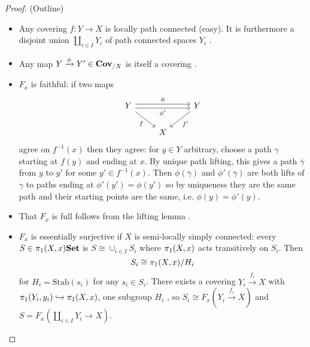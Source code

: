 \begin{proof}(Outline)
    \begin{itemize}
        \item Any covering $f: Y \to X$ is locally path connected (easy). It is furthermore a disjoint union $\coprod_{i \in I} Y_i$ of path connected spaces $Y_i$ \cite[Theorem~25.4]{MunkresTopology}.
        \item Any map $Y \xrightarrow{\phi}Y' \in \catCoveringSpace_{/X}$ is itself a covering \cite[Lemma~80.2(a)]{MunkresTopology}.
        \item $F_x$ is faithful: if two maps 
        \[
            \begin{tikzcd}
                Y \arrow[rr, "\phi'"', shift right] \arrow[rr, "\phi", shift left] \arrow[rd, "f"'] &   & Y \arrow[ld, "f'"] \\
                & X & 
            \end{tikzcd}
        \] agree on $f^{-1}(x)$ then they agree: for $y \in Y$ arbitrary, choose a path $\gamma$ starting at $f(y)$ and ending at $x$. By unique path lifting, this gives a path $\overline{\gamma}$ from $y$ to $y'$ for some $y' \in f^{-1}(x)$. Then $\phi(\overline{\gamma})$ and $\phi'(\overline{\gamma})$ are both lifts of $\gamma$ to paths ending at $\phi'(y') = \phi(y')$ so by uniqueness they are the same path and their starting points are the same, i.e. $\phi(y) = \phi'(y)$. 
        \item That $F_x$ is full follows from the lifting lemma \cite[Lemma~79.1]{MunkresTopology}.
        \item $F_x$ is essentially surjective if $X$ is semi-locally simply connected: every $S \in \homotopy[1](X,x)\catSet$ is $S \cong \cup_{i\in I}S_i$ where $\homotopy[1](X,x)$ acts transitively on $S_i$.  Then \[
            S_i \cong \homotopy[1](X,x) / H_i
        \] for $H_i = \text{Stab}(s_i)$ for any $s_i \in S_i$. There exists a covering $Y_i \xrightarrow{f_i} X$ with $\homotopy[1](Y_i, y_i) \xhookrightarrow{} \homotopy[1](X,x)$, one subgroup $H_i$ \cite[Theorem~82.1]{MunkresTopology}, so $S_i \cong F_x(Y_i \xrightarrow{f_i} X)$ and $S = F_x(\coprod_{i \in I} Y_i \to X)$.
        \end{itemize}
\end{proof}
